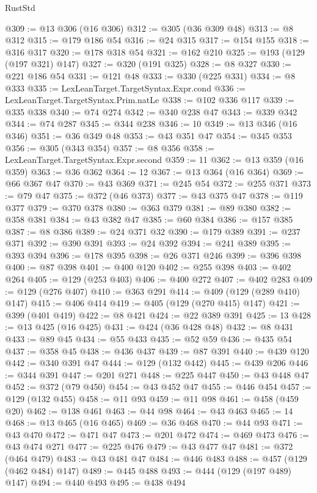 \begin{lexlean}{RustStd}
\begin{coremodule}
@309 := @13 @306 (@16 @306)
@312 := @305 (@36 @309 @48)
@313 := @8 @312
@315 := @179 @186 @54
@316 := @24 @315
@317 := @154 @155
@318 := @316 @317
@320 := @178 @318 @54
@321 := @162 @210
@325 := @193 (@129 (@197 @321) @147)
@327 := @320 (@191 @325)
@328 := @8 @327
@330 := @221 @186 @54
@331 := @121 @48
@333 := @330 (@225 @331)
@334 := @8 @333
@335 := LexLeanTarget.TargetSyntax.Expr.cond
@336 := LexLeanTarget.TargetSyntax.Prim.natLe
@338 := @102 @336 @117
@339 := @335 @338
@340 := @74 @274
@342 := @340 @238 @47
@343 := @339 @342
@344 := @74 @287
@345 := @344 @238
@346 := 10
@349 := @13 @346 (@16 @346)
@351 := @36 @349 @48
@353 := @43 @351 @47
@354 := @345 @353
@356 := @305 (@343 @354)
@357 := @8 @356
@358 := LexLeanTarget.TargetSyntax.Expr.second
@359 := 11
@362 := @13 @359 (@16 @359)
@363 := @36 @362
@364 := 12
@367 := @13 @364 (@16 @364)
@369 := @66 @367 @47
@370 := @43 @369
@371 := @245 @54
@372 := @255 @371
@373 := @79 @47
@375 := @372 (@46 @373)
@377 := @43 @375 @47
@378 := @119 @377
@379 := @370 @378
@380 := @363 @379
@381 := @89 @380
@382 := @358 @381
@384 := @43 @382 @47
@385 := @60 @384
@386 := @157 @385
@387 := @8 @386
@389 := @24 @371 @32
@390 := @179 @389
@391 := @237 @371
@392 := @390 @391
@393 := @24 @392
@394 := @241 @389
@395 := @393 @394
@396 := @178 @395
@398 := @26 @371 @246
@399 := @396 @398
@400 := @87 @398
@401 := @400 @120
@402 := @255 @398
@403 := @402 @264
@405 := @129 (@253 @403)
@406 := @400 @272
@407 := @402 @283
@409 := @129 (@276 @407)
@410 := @363 @291
@414 := @409 (@129 (@289 @410) @147)
@415 := @406 @414
@419 := @405 (@129 (@270 @415) @147)
@421 := @399 (@401 @419)
@422 := @8 @421
@424 := @22 @389 @391
@425 := 13
@428 := @13 @425 (@16 @425)
@431 := @424 (@36 @428 @48)
@432 := @8 @431
@433 := @89 @45
@434 := @55 @433
@435 := @52 @59
@436 := @435 @54
@437 := @358 @45
@438 := @436 @437
@439 := @87 @391
@440 := @439 @120
@442 := @340 @391 @47
@444 := @129 (@132 @442)
@445 := @439 @206
@446 := @344 @391
@447 := @201 @271
@448 := @225 @447
@450 := @43 @448 @47
@452 := @372 (@79 @450)
@454 := @43 @452 @47
@455 := @446 @454
@457 := @129 (@132 @455)
@458 := @11 @93
@459 := @11 @98
@461 := @458 (@459 @20)
@462 := @138 @461
@463 := @44 @98
@464 := @43 @463
@465 := 14
@468 := @13 @465 (@16 @465)
@469 := @36 @468
@470 := @44 @93
@471 := @43 @470
@472 := @471 @47
@473 := @201 @472
@474 := @469 @473
@476 := @43 @474 @271
@477 := @225 @476
@479 := @43 @477 @47
@481 := @372 (@464 @479)
@483 := @43 @481 @47
@484 := @446 @483
@488 := @457 (@129 (@462 @484) @147)
@489 := @445 @488
@493 := @444 (@129 (@197 @489) @147)
@494 := @440 @493
@495 := @438 @494

\end{coremodule}
\end{lexlean}
